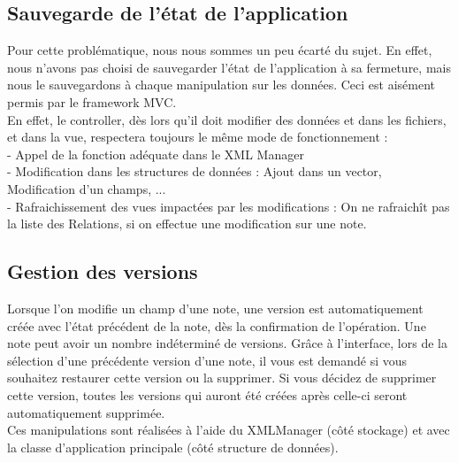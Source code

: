 \documentclass[a4paper]{report}
\begin{document}
\subsection{Sauvegarde de l'état de l'application}
Pour cette problématique, nous nous sommes un peu écarté du sujet. En effet, nous n'avons pas choisi de sauvegarder l'état de l'application à sa fermeture, mais nous le sauvegardons à chaque manipulation sur les données. Ceci est aisément permis par le framework MVC.\\
En effet, le controller, dès lors qu'il doit modifier des données et dans les fichiers, et dans la vue, respectera toujours le même mode de fonctionnement :\\
- Appel de la fonction adéquate dans le XML Manager \\
- Modification dans les structures de données : Ajout dans un vector, Modification d'un champs, ... \\
- Rafraichissement des vues impactées par les modifications : On ne rafraichît pas la liste des Relations, si on effectue une modification sur une note.

\subsection{Gestion des versions}
Lorsque l'on modifie un champ d'une note, une version est automatiquement créée avec l'état précédent de la note, dès la confirmation de l'opération. Une note peut avoir un nombre indéterminé de versions. Grâce à l'interface, lors de la sélection d'une précédente version d'une note, il vous est demandé si vous souhaitez restaurer cette version ou la supprimer. Si vous décidez de supprimer cette version, toutes les versions qui auront été créées après celle-ci seront automatiquement supprimée.\\
Ces manipulations sont réalisées à l'aide du XMLManager (côté stockage) et avec la classe d'application principale (côté structure de données).
\end{document}
